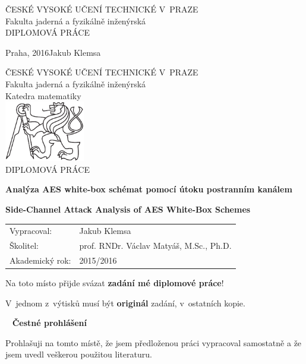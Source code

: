 \documentclass[11pt,a4paper]{report}
\theoremstyle{definition}
\theoremstyle{remark}
\newcommand{\cvut}{ČESKÉ VYSOKÉ UČENÍ TECHNICKÉ V~PRAZE}
\newcommand{\fjfi}{Fakulta jaderná a fyzikálně inženýrská}
\newcommand{\km}{Katedra matematiky}
\newcommand{\TYPPRACE}{DIPLOMOVÁ PRÁCE}
\newcommand{\mePrace}{mé diplomové práce}
\newcommand{\nazevcz}{Analýza AES white-box schémat pomocí útoku postranním kanálem}
\newcommand{\nazeven}{Side-Channel Attack Analysis of AES White-Box Schemes}
\newcommand{\autor}{Jakub Klemsa}
\newcommand{\vedouci}{prof. RNDr. Václav Matyáš, M.Sc., Ph.D.}
\newcommand{\rok}{2016}
\newcommand{\akadRok}{2015/2016}
\newcommand{\misto}{Praha}
\begin{document}
\begin{titlepage}
	
	\thispagestyle{empty}
	\begin{center}
		{\Large \cvut \\[12pt] \fjfi \\[260pt]}
		{\Huge \TYPPRACE}
	\end{center}
	\vfill
	{
		\Large \misto, \rok \hfill \autor
	}
	\newpage
	
	
	\thispagestyle{empty}
	\begin{center}
		{\Large \cvut \\[10pt] \fjfi \\[10pt] \km \\[40pt]}
		\includegraphics[height=75pt]{lev.pdf} \\[100pt]
		
		{\LARGE \TYPPRACE \\[60pt]}
		
		{\Large\bf \nazevcz \\[30pt]}
		
		{\Large\bf \nazeven}
	\end{center}
	\vfill
	{
		\Large
		\begin{tabular}{ll}
		Vypracoval: & \autor\\[3pt]
		Školitel: & \vedouci\\[3pt]
		Akademický rok: & \akadRok
		\end{tabular}
	}
	\newpage
	
	
	\thispagestyle{empty}
	\Large
	Na toto místo přijde svázat \textbf{zadání \mePrace}!
	
	\vspace{4mm}
	V~jednom z~výtisků musí být \textbf{originál} zadání, v~ostatních kopie.
	\normalsize
	\newpage
	
	
	\thispagestyle{empty}
	~
	\vfill
	\noindent\textbf{Čestné prohlášení}
	\vspace{0.5cm}
	
	\noindent
	Prohlašuji na tomto místě, že jsem předloženou práci vypracoval samostatně a že jsem uvedl veškerou použitou literaturu.
	\vspace{1.5cm}
	

\end{titlepage}
\end{document}
